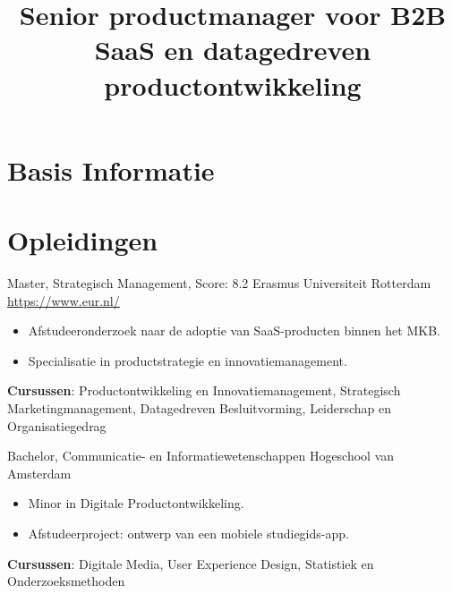 \documentclass[a4paper, serif, 10pt]{moderncv}
\title{Senior productmanager voor B2B SaaS en datagedreven productontwikkeling}
\begin{document}
\maketitle

\section{Basis Informatie}

\section{Opleidingen}

        {Master, Strategisch Management, Score: 8.2}
        {Erasmus Universiteit Rotterdam}
        {\url{https://www.eur.nl/}}
        {}
        {\begin{itemize}
\item Afstudeeronderzoek naar de adoptie van SaaS-producten binnen het MKB.
\item Specialisatie in productstrategie en innovatiemanagement.
\end{itemize}
\textbf{Cursussen}: Productontwikkeling en Innovatiemanagement, Strategisch Marketingmanagement, Datagedreven Besluitvorming, Leiderschap en Organisatiegedrag}

        {Bachelor, Communicatie- en Informatiewetenschappen}
        {Hogeschool van Amsterdam}
        {}
        {}
        {\begin{itemize}
\item Minor in Digitale Productontwikkeling.
\item Afstudeerproject: ontwerp van een mobiele studiegids-app.
\end{itemize}
\textbf{Cursussen}: Digitale Media, User Experience Design, Statistiek en Onderzoeksmethoden}
\end{document}
